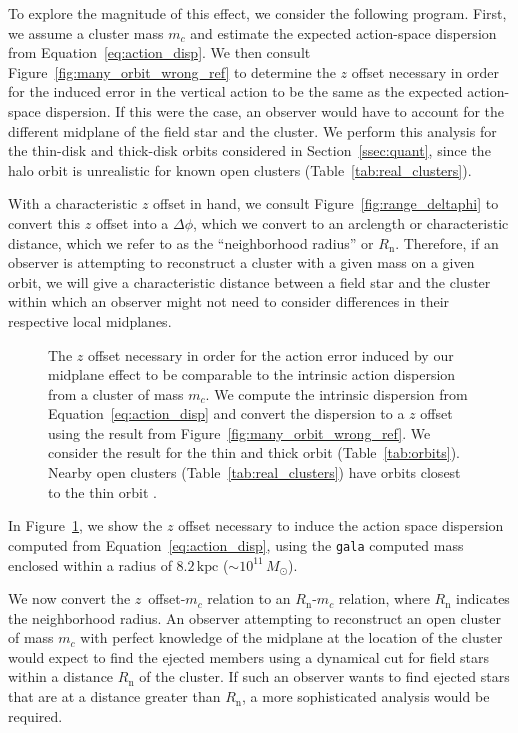 \documentclass[twocolumn]{aastex62}
\newcommand{\kpc}{\text{kpc}}
\newcommand{\n}{\text{n}}
\begin{document}
To explore the magnitude of this effect, we consider the following program.
First, we assume a cluster mass $m_c$ and estimate the expected action-space
dispersion from Equation~\ref{eq:action_disp}. We then consult
Figure~\ref{fig:many_orbit_wrong_ref} to determine the $z$ offset necessary in
order for the induced error in the vertical action to be the same as the
expected action-space dispersion. If this were the case, an observer would
have to account for the different midplane of the field star and the cluster.
We perform this analysis for the thin-disk and thick-disk orbits considered in
Section~\ref{ssec:quant}, since the halo orbit is unrealistic for known open
clusters (Table~\ref{tab:real_clusters}).

With a characteristic $z$ offset in hand, we consult
Figure~\ref{fig:range_deltaphi} to convert this $z$ offset into a $\Delta
\phi$, which we convert to an arclength or characteristic distance, which we
refer to as the ``neighborhood radius'' or $R_{\n}$. Therefore, if an observer
is attempting to reconstruct a cluster with a given mass on a given orbit, we
will give a characteristic distance between a field star and the cluster
within which an observer might not need to consider differences in their
respective local midplanes.

\begin{figure}
\caption{The $z$ offset necessary in order for the action error induced by our
midplane effect to be comparable to the intrinsic action dispersion from a
cluster of mass $m_c$. We compute the intrinsic dispersion from
Equation~\ref{eq:action_disp} and convert the dispersion to a $z$ offset using
the result from Figure~\ref{fig:many_orbit_wrong_ref}. We consider the result
for the thin and thick orbit (Table~\ref{tab:orbits}). Nearby open clusters
(Table~\ref{tab:real_clusters}) have orbits closest to the thin orbit .}
\label{fig:cluster_offset}
\end{figure}

In Figure~\ref{fig:cluster_offset}, we show the $z$ offset necessary to induce
the action space dispersion computed from Equation~\ref{eq:action_disp}, using
the \texttt{gala} computed mass enclosed within a radius of $8.2\,\kpc$ ($\sim
10^{11}\,M_{\odot}$).

We now convert the $z$~offset-$m_c$ relation to an $R_{\n}$-$m_c$ relation,
where $R_{\n}$ indicates the neighborhood radius. An observer
attempting to reconstruct an open cluster of mass $m_c$ with perfect knowledge
of the midplane at the location of the cluster would expect to find the
ejected members using a dynamical cut for field stars within a distance
$R_{\n}$ of the cluster. If such an observer wants to find ejected stars that
are at a distance greater than $R_{\n}$, a more sophisticated analysis would
be required.
\end{document}
